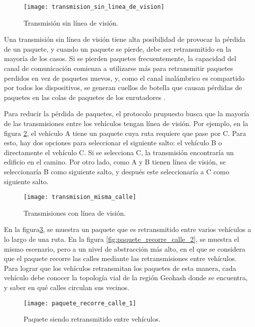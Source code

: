 \begin{figure}[th]
\centering
\texttt{[image: transmision\_sin\_linea\_de\_vision]}
\decoRule
\caption[Transmisión sin línea de visión]{Transmisión sin línea de visión.}
\label{fig:transmision_sin_linea_de_vision}
\end{figure}

Una transmisión sin línea de visión tiene alta posibilidad de provocar la
pérdida de un paquete, y cuando un paquete se pierde, debe ser retransmitido en
la mayoría de los casos. Si se pierden paquetes frecuentemente, la capacidad del
canal de comunicación comienza a utilizarse más para retransmitir paquetes
perdidos en vez de paquetes nuevos, y, como el canal inalámbrico es compartido
por todos los dispositivos, se generan cuellos de botella que causan pérdidas de
paquetes en las colas de paquetes de los enrutadores \cite{Kurose2013}.

Para reducir la pérdida de paquetes, el protocolo prupuesto busca que la mayoría
de las transmisiones entre los vehículos tengan línea de visión. Por ejemplo, en
la figura \ref{fig:transmision_misma_calle}, el vehículo A tiene un paquete cuya
ruta requiere que pase por C. Para esto, hay dos opciones para seleccionar el
siguiente salto: el vehículo B o directamente el vehículo C. Si se selecciona
C, la transmisión encontraría un edificio en el camino. Por otro lado, como A y
B tienen línea de visión, se seleccionaría B como siguiente salto, y después
este seleccionaría a C como siguiente salto.

\begin{figure}[th]
\centering
\texttt{[image: transmision\_misma\_calle]}
\decoRule
\caption[Transmisiones con línea de visión]{Transmisiones con línea de visión.}
\label{fig:transmision_misma_calle}
\end{figure}

En la figura\ref{fig:paquete_recorre_calle_1}, se muestra un paquete que es
retransmitido entre varios vehículos a lo largo de una ruta. En la figura
\ref{fig:paquete_recorre_calle_2}, se muestra el mismo escenario, pero a un
nivel de abstracción más alto, en el que se considera que el paquete recorre las
calles mediante las retransmisiones entre vehículos. Para lograr que los
vehículos retransmitan los paquetes de esta manera, cada vehículo debe conocer
la topología vial de la región Geohash donde se encuentra, y saber en qué calles
circulan sus vecinos.

\begin{figure}[th]
\centering
\texttt{[image: paquete\_recorre\_calle\_1]}
\decoRule
\caption[Paquete siendo retransmitido entr vehículos]{Paquete siendo
retransmitido entre vehículos.}
\label{fig:paquete_recorre_calle_1}
\end{figure}

